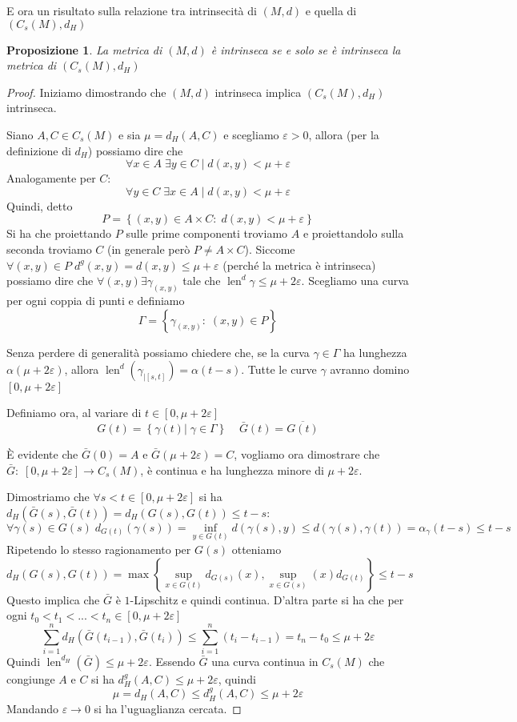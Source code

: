 \documentclass[a4paper,10pt]{article}
\newcounter{counter1}
\theoremstyle{plain}
\newtheorem{mypro}[counter1]{Proposizione}
\theoremstyle{definition}
\theoremstyle{remark}
\newcommand{\obar}[1]{\overline{#1}}
\newcommand{\set}[1]{\left\{#1\right\}}
\newcommand{\pa}[1]{\left(#1\right)}
\newcommand{\bra}[1]{\left[#1\right]}
\DeclareMathOperator{\len}{len}
\begin{document}
E ora un risultato sulla relazione tra intrinsecità di $(M,d)$ e
quella di $\pa{C_s(M),d_H}$
\begin{mypro}
  La metrica di $(M,d)$ è intrinseca se e solo se è intrinseca la
  metrica di $(C_s(M),d_H)$
\end{mypro}
\begin{proof}
  Iniziamo dimostrando che $(M,d)$ intrinseca implica $(C_s(M),d_H)$
  intrinseca.

  Siano $A,C \in C_s(M)$ e sia $\mu = d_H(A,C)$ e scegliamo
  $\varepsilon >0$, allora (per la definizione di $d_H$) possiamo dire
  che
  \[ \forall x \in A\; \exists y \in C \mid d(x,y) < \mu +
  \varepsilon \]
  Analogamente per $C$:
  \[ \forall y \in C\; \exists x \in A \mid d(x,y) < \mu +
  \varepsilon \]
  Quindi, detto
  \[ P = \set{(x,y)\in A\times C:\; d(x,y) < \mu + \varepsilon} \]
  Si ha che proiettando $P$ sulle prime componenti troviamo $A$ e
  proiettandolo sulla seconda troviamo $C$ (in generale però $P \neq A
  \times C$).  Siccome $\forall (x,y) \in P\; d^g(x,y) = d(x,y) \le \mu
  + \varepsilon$ (perché la metrica è intrinseca) possiamo dire che
  $\forall (x,y) \exists \gamma_{(x,y)}$ tale che $\len ^d \gamma \le
  \mu + 2 \varepsilon$. Scegliamo una curva per ogni coppia di punti e
  definiamo
  \[ \Gamma = \set{\gamma _{(x,y)} :\; (x,y) \in P} \]

  Senza perdere di generalità possiamo chiedere che, se la curva
  $\gamma \in \Gamma$ ha lunghezza $\alpha (\mu + 2
  \varepsilon )$, allora $\len ^d \pa{ \gamma _{|\bra{s,t}}} = \alpha
  (t-s)$. Tutte le curve $\gamma$ avranno domino $\bra{0,\mu
    + 2 \varepsilon}$

  Definiamo ora, al variare di $t\in \bra{0,\mu + 2 \varepsilon}$
  \[ G(t) = \set{\gamma (t) | \; \gamma \in \Gamma} \;\;\;\; \bar G(t)
  = \obar{ G(t)} \]

  \`E evidente che $\bar G(0) = A$ e $\bar G(\mu + 2 \varepsilon) =
  C$, vogliamo ora dimostrare che $\bar G:\; \bra{0,\mu + 2
    \varepsilon} \to C_s(M)$, \`e continua e ha lunghezza minore di
  $\mu + 2 \varepsilon$.
  
  Dimostriamo che $\forall s<t \in \bra{0,\mu + 2 \varepsilon}$ si ha
  $d_H(\bar G(s),\bar G(t)) = d_H(G(s),G(t)) \le t-s$:
  \[ \forall \gamma(s) \in G(s) \; d_{G(t)}(\gamma(s)) = \inf _{y \in
    G(t)} d(\gamma(s),y) \le d(\gamma(s),\gamma(t)) = \alpha
  _{\gamma} (t-s) \le t-s \]
  Ripetendo lo stesso ragionamento per $G(s)$ otteniamo
  \[ d_H(G(s), G(t)) = \max\set{\sup_{x\in G(t)} d_{G(s)}(x) , \sup
    _{x\in G(s)} (x) d_{G(t)} } \le t-s \]
  Questo implica che $\bar G$ è $1$-Lipschitz e quindi
  continua. D'altra parte si ha che per ogni $t_0< t_1< ... < t_n \in
  \bra{0,\mu + 2 \varepsilon}$ 
  \[ \sum _{i=1} ^n d_H(\bar G(t_{i-1}), \bar G(t_i)) \le \sum _{i=1}
  ^n (t_i - t_{i-1}) = t_n - t_0 \le \mu + 2\varepsilon \]
  Quindi $\len ^{d_H}(\bar G) \le \mu + 2 \varepsilon$.
  Essendo $\bar G$ una curva continua in $C_s(M)$ che congiunge $A$ e
  $C$ si ha $d_H ^g (A,C) \le \mu + 2\varepsilon $, quindi
  \[ \mu = d_H (A,C) \le d_H^g(A,C) \le \mu + 2\varepsilon \]
  Mandando $\varepsilon \to 0$ si ha l'uguaglianza cercata.


\end{proof}
\end{document}
